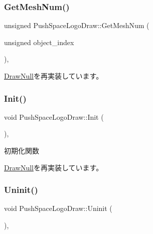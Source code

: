 \mbox{\label{class_push_space_logo_draw_a9a40fca53e23b9970a7c5decaa3d2da6}} 
\subsubsection{\texorpdfstring{Get\+Mesh\+Num()}{GetMeshNum()}}
{\footnotesize\ttfamily unsigned Push\+Space\+Logo\+Draw\+::\+Get\+Mesh\+Num (\begin{DoxyParamCaption}\item[{unsigned}]{object\+\_\+index }\end{DoxyParamCaption})\hspace{0.3cm}{\ttfamily [override]}, {\ttfamily [virtual]}}



\mbox{\hyperlink{class_draw_null_ad735978a85a5f3583eecd82d6bfe6413}{Draw\+Null}}を再実装しています。

\mbox{\label{class_push_space_logo_draw_a7ad3fe53d9bda4ea16c958bc102ff54e}} 
\subsubsection{\texorpdfstring{Init()}{Init()}}
{\footnotesize\ttfamily void Push\+Space\+Logo\+Draw\+::\+Init (\begin{DoxyParamCaption}{ }\end{DoxyParamCaption})\hspace{0.3cm}{\ttfamily [override]}, {\ttfamily [virtual]}}



初期化関数 



\mbox{\hyperlink{class_draw_null_acd7fef3ccea1da537ac9507ffbb6dd2e}{Draw\+Null}}を再実装しています。

\mbox{\label{class_push_space_logo_draw_a79021c1df43968d6008de74126d53fba}} 
\subsubsection{\texorpdfstring{Uninit()}{Uninit()}}
{\footnotesize\ttfamily void Push\+Space\+Logo\+Draw\+::\+Uninit (\begin{DoxyParamCaption}{ }\end{DoxyParamCaption})\hspace{0.3cm}{\ttfamily [override]}, {\ttfamily [virtual]}}



